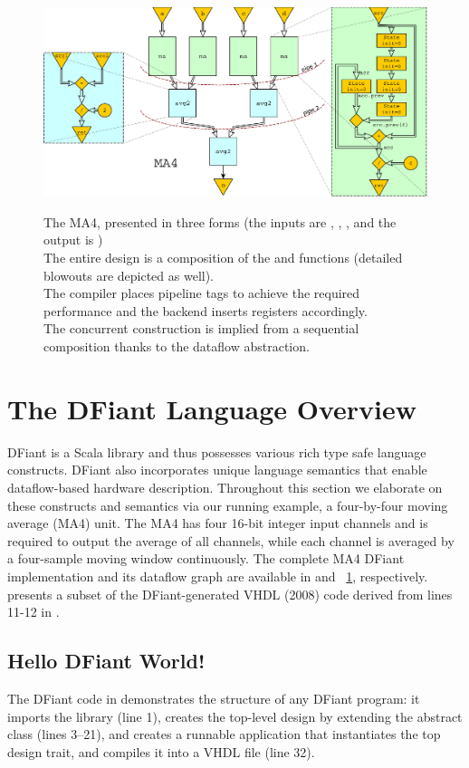 \begin{figure}[t!]
\begin{minipage}[b][10cm][t]{0.34\linewidth}
  	\includegraphics[width=0.884\linewidth]{graphics/ma.pdf}
  	\captionsetup{justification=centering}
		\label{fig:MADraw}
  \end{minipage}%
  \captionsetup{justification=centering}      
  \caption{
		The MA4, presented in three forms (the inputs are , , ,  and the output is ) \\ 
		The entire design is a composition of the  and  functions (detailed blowouts are depicted as well). \\ 
		The compiler places pipeline tags to achieve the required performance and the backend inserts registers accordingly. \\
		The concurrent construction is implied from a sequential composition thanks to the dataflow abstraction. 
	}
\end{figure}

\section{The DFiant Language Overview}
\label{sec:dfiant}
DFiant is a Scala library and thus possesses various rich type safe language constructs. DFiant also incorporates unique language semantics that enable dataflow-based hardware description. Throughout this section we elaborate on these constructs and semantics via our running example, a four-by-four moving average (MA4) unit. The MA4 has four 16-bit integer input channels and is required to output the average of all channels, while each channel is averaged by a four-sample moving window continuously. The complete MA4 DFiant implementation and its dataflow graph are available in  and ~\ref{fig:MADraw}, respectively.  presents a subset of the DFiant-generated VHDL (2008) code derived from lines 11-12 in .


\subsection{Hello DFiant World!}
The DFiant code in  demonstrates the structure of any DFiant program: it imports the  library (line 1), creates the top-level design by extending the  abstract class (lines 3--21), and creates a runnable application that instantiates the top design trait, and compiles it into a VHDL file (line 32).

